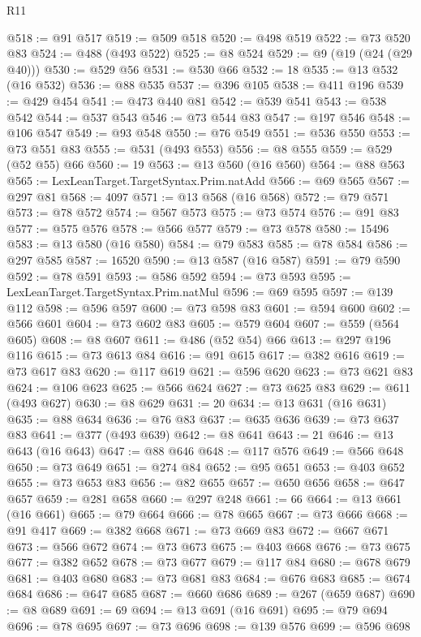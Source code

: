 \begin{lexlean}{R11}
\begin{coremodule}
@518 := @91 @517
@519 := @509 @518
@520 := @498 @519
@522 := @73 @520 @83
@524 := @488 (@493 @522)
@525 := @8 @524
@529 := @9 (@19 (@24 (@29 @40)))
@530 := @529 @56
@531 := @530 @66
@532 := 18
@535 := @13 @532 (@16 @532)
@536 := @88 @535
@537 := @396 @105
@538 := @411 @196
@539 := @429 @454
@541 := @473 @440 @81
@542 := @539 @541
@543 := @538 @542
@544 := @537 @543
@546 := @73 @544 @83
@547 := @197 @546
@548 := @106 @547
@549 := @93 @548
@550 := @76 @549
@551 := @536 @550
@553 := @73 @551 @83
@555 := @531 (@493 @553)
@556 := @8 @555
@559 := @529 (@52 @55) @66
@560 := 19
@563 := @13 @560 (@16 @560)
@564 := @88 @563
@565 := LexLeanTarget.TargetSyntax.Prim.natAdd
@566 := @69 @565
@567 := @297 @81
@568 := 4097
@571 := @13 @568 (@16 @568)
@572 := @79 @571
@573 := @78 @572
@574 := @567 @573
@575 := @73 @574
@576 := @91 @83
@577 := @575 @576
@578 := @566 @577
@579 := @73 @578
@580 := 15496
@583 := @13 @580 (@16 @580)
@584 := @79 @583
@585 := @78 @584
@586 := @297 @585
@587 := 16520
@590 := @13 @587 (@16 @587)
@591 := @79 @590
@592 := @78 @591
@593 := @586 @592
@594 := @73 @593
@595 := LexLeanTarget.TargetSyntax.Prim.natMul
@596 := @69 @595
@597 := @139 @112
@598 := @596 @597
@600 := @73 @598 @83
@601 := @594 @600
@602 := @566 @601
@604 := @73 @602 @83
@605 := @579 @604
@607 := @559 (@564 @605)
@608 := @8 @607
@611 := @486 (@52 @54) @66
@613 := @297 @196 @116
@615 := @73 @613 @84
@616 := @91 @615
@617 := @382 @616
@619 := @73 @617 @83
@620 := @117 @619
@621 := @596 @620
@623 := @73 @621 @83
@624 := @106 @623
@625 := @566 @624
@627 := @73 @625 @83
@629 := @611 (@493 @627)
@630 := @8 @629
@631 := 20
@634 := @13 @631 (@16 @631)
@635 := @88 @634
@636 := @76 @83
@637 := @635 @636
@639 := @73 @637 @83
@641 := @377 (@493 @639)
@642 := @8 @641
@643 := 21
@646 := @13 @643 (@16 @643)
@647 := @88 @646
@648 := @117 @576
@649 := @566 @648
@650 := @73 @649
@651 := @274 @84
@652 := @95 @651
@653 := @403 @652
@655 := @73 @653 @83
@656 := @82 @655
@657 := @650 @656
@658 := @647 @657
@659 := @281 @658
@660 := @297 @248
@661 := 66
@664 := @13 @661 (@16 @661)
@665 := @79 @664
@666 := @78 @665
@667 := @73 @666
@668 := @91 @417
@669 := @382 @668
@671 := @73 @669 @83
@672 := @667 @671
@673 := @566 @672
@674 := @73 @673
@675 := @403 @668
@676 := @73 @675
@677 := @382 @652
@678 := @73 @677
@679 := @117 @84
@680 := @678 @679
@681 := @403 @680
@683 := @73 @681 @83
@684 := @676 @683
@685 := @674 @684
@686 := @647 @685
@687 := @660 @686
@689 := @267 (@659 @687)
@690 := @8 @689
@691 := 69
@694 := @13 @691 (@16 @691)
@695 := @79 @694
@696 := @78 @695
@697 := @73 @696
@698 := @139 @576
@699 := @596 @698

\end{coremodule}
\end{lexlean}

